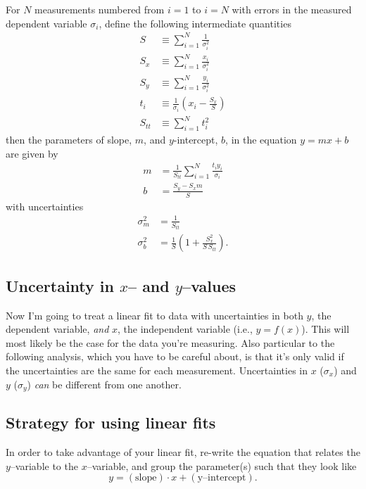 \documentclass[10pt,letterpaper,twoside]{article}
\begin{document}
For $N$ measurements numbered from $i=1$ to $i=N$ with errors in the measured dependent variable $\sigma_i$, define the following intermediate quantities
\begin{align}
  S      &\equiv \sum_{i=1}^{N} \frac{1}{\sigma_i^2} \\
  S_x    &\equiv \sum_{i=1}^{N}\frac{x_i}{\sigma_i^2} \\
  S_y    &\equiv \sum_{i=1}^N \frac{y_i}{\sigma_i^2} \\
  t_i    &\equiv \frac{1}{\sigma_i}\left( x_i - \frac{S_x}{S} \right) \\
  S_{tt} &\equiv \sum_{i=1}^N t_i^2
\end{align}
then the parameters of slope, $m$, and $y$-intercept, $b$, in the equation $y=mx+b$ are given by
\begin{align}
  m &= \frac{1}{S_{tt}} \sum_{i=1}^N \frac{t_i y_i}{\sigma_i} \\
  b &= \frac{S_y-S_x m}{ S}
\end{align}
with uncertainties
\begin{align}
  \sigma_m^2 &= \frac{1}{S_{tt}} \\
  \sigma_b^2 &= \frac{1}{S}\left( 1+\frac{S_x^2}{S\,S_{tt}} \right).
\end{align}

\subsection{Uncertainty in $x$-- and $y$--values}
Now I'm going to treat a linear fit to data with uncertainties in both $y$, the dependent variable, \textit{and} $x$, the independent variable (i.e., $y=f(x)$).
This will most likely be the case for the data you're measuring.
Also particular to the following analysis, which you have to be careful about, is that it's only valid if the uncertainties are the same for each measurement.
Uncertainties in $x$ ($\sigma_x$) and $y$ ($\sigma_y$) \textit{can} be different from one another.


\subsection{Strategy for using linear fits}
In order to take advantage of your linear fit, re-write the equation that relates the $y$--variable to the $x$--variable, and group the parameter(s) such that they look like
\begin{equation}
	y=(\mathrm{slope})\cdot x + (\text{y--intercept}).
\end{equation}
\end{document}

